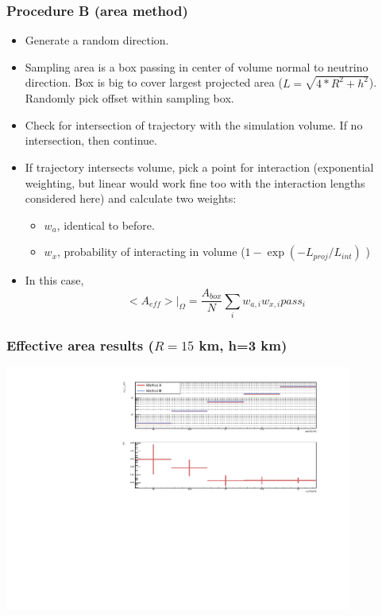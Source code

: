 \documentclass[hyperref={pdfpagelabels=false},aspectratio=169]{beamer} \mode<presentation> { \usetheme{Boadilla} }
\begin{document}
\begin{frame}
\frametitle{Procedure B (area method)} 
\begin{itemize}
\item Generate a random direction. 
\item Sampling area is a box  passing in center of volume normal to neutrino direction. Box is big to cover largest projected area ($L= \sqrt{4*R^2+h^2}$). Randomly pick offset within sampling box.
\item Check for intersection of trajectory with the simulation volume. If no intersection, then continue. 
\item If trajectory intersects volume, pick a point for interaction (exponential weighting, but linear would work fine too with the interaction lengths considered here) and calculate two weights: 
\begin{itemize}
  \item $w_a$, identical to before.
  \item $w_x$, probability of interacting in volume ($1-\exp(-L_{proj}/L_{int})$ ) 
\end{itemize} 
\item In this case, 
\begin{equation}
  <A_{eff}> |_{\Omega}  = \frac{A_{box}}{N} \sum_i w_{a,i} w_{x,i} pass_i
\end{equation} 
\end{itemize} 
\end{frame}

\begin{frame}
  \frametitle{Effective area results ($R=15$ km, h=3 km)} 
  \centering
  \includegraphics[width=4.5in]{result}

\end{frame} 
\end{document}
